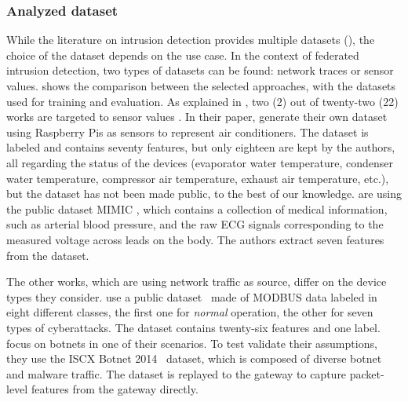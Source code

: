 \subsubsection{Analyzed dataset}
\label{sec:sota.quali.dataset}

While the literature on intrusion detection provides multiple datasets (), the choice of the dataset depends on the use case.
In the context of federated intrusion detection, two types of datasets can be found: network traces or sensor values.
 shows the comparison between the selected approaches, with the datasets used for training and evaluation.
As explained in , two (2) out of twenty-two (22) works are targeted to sensor values \cite{zhang_BlockchainbasedFederatedLearning_2020,schneble_Attackdetectionusing_2019}.
In their paper, \textcite{zhang_BlockchainbasedFederatedLearning_2020} generate their own dataset using Raspberry Pis as sensors to represent air conditioners.
The dataset is labeled and contains seventy features, but only eighteen are kept by the authors, all regarding the status of the devices (\eg evaporator water temperature, condenser water temperature, compressor air temperature, exhaust air temperature, etc.), but the dataset has not been made public, to the best of our knowledge.
\textcite{schneble_Attackdetectionusing_2019} are using the public dataset MIMIC \cite{Johnson2016a}, which contains a collection of medical information, such as arterial blood pressure, and the raw ECG signals corresponding to the measured voltage across leads on the body.
The authors extract seven features from the dataset.

The other works, which are using network traffic as source, differ on the device types they consider.
\textcite{li_DeepFedFederatedDeep_2020} use a public dataset~\cite{Morris2014} made of MODBUS data labeled in eight different classes, the first one for \emph{normal} operation, the other for seven types of cyberattacks.
The dataset contains twenty-six features and one label.
\textcite{qin_LineSpeedScalableIntrusion_2020a} focus on botnets in one of their scenarios.
To test validate their assumptions, they use the ISCX Botnet 2014~\cite{BiglarBeigi2014} dataset, which is composed of diverse botnet and malware traffic.
The dataset is replayed to the gateway to capture packet-level features from the gateway directly.


